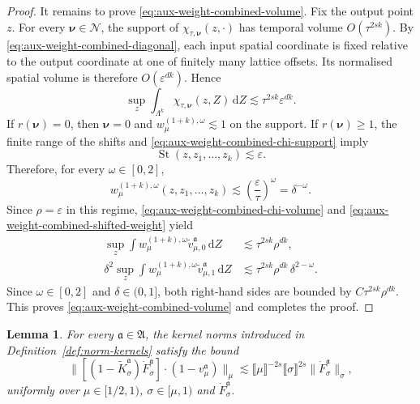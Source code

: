 \documentclass{article}
\numberwithin{equation}{section}
\newcommand{\mathd}{\mathrm{d}}
\theoremstyle{plain}
\newtheorem{lemma}[theorem]{Lemma}
\theoremstyle{definition}
\begin{document}
\begin{proof}
	It remains to prove \eqref{eq:aux-weight-combined-volume}. Fix the output
	point $z$. For every $\boldsymbol\nu\in\mathcal N$, the support of
	$\chi_{\tau,\boldsymbol\nu}(z,\cdot)$ has temporal volume
	$O(\tau^{2sk})$. By \eqref{eq:aux-weight-combined-diagonal}, each input
	spatial coordinate is fixed relative to the output coordinate at one of
	finitely many lattice offsets. Its normalised spatial volume is therefore
	$O(\varepsilon^{dk})$. Hence
	\begin{equation}
		\label{eq:aux-weight-combined-chi-volume}
		\sup_z\int_{\Lambda^k}
		\chi_{\tau,\boldsymbol\nu}(z,Z)\,\mathd Z
		\lesssim
		\tau^{2sk}\varepsilon^{dk}.
	\end{equation}
	If $r(\boldsymbol\nu)=0$, then $\boldsymbol\nu=0$ and
	$w_\mu^{(1+k),\omega}\lesssim1$ on the support. If
	$r(\boldsymbol\nu)\geqslant1$, the finite range of the shifts and
	\eqref{eq:aux-weight-combined-chi-support} imply
	\[
	\operatorname{St}(z,z_1,\ldots,z_k)\lesssim\varepsilon.
	\]
	Therefore, for every $\omega\in[0,2]$,
	\begin{equation}
		\label{eq:aux-weight-combined-shifted-weight}
		w_\mu^{(1+k),\omega}(z,z_1,\ldots,z_k)
		\lesssim
		\left(\frac{\varepsilon}{\tau}\right)^\omega
		=\delta^{-\omega}.
	\end{equation}
	Since $\rho=\varepsilon$ in this regime,
	\eqref{eq:aux-weight-combined-chi-volume} and
	\eqref{eq:aux-weight-combined-shifted-weight} yield
	\begin{align*}
		\sup_z\int
		w_\mu^{(1+k),\omega}
		\tilde v_{\mu,0}^{\mathfrak a}
		\,\mathd Z
		&\lesssim
		\tau^{2sk}\rho^{dk},
		\\
		\delta^2\sup_z\int
		w_\mu^{(1+k),\omega}
		\tilde v_{\mu,1}^{\mathfrak a}
		\,\mathd Z
		&\lesssim
		\tau^{2sk}\rho^{dk}\,
		\delta^{2-\omega}.
	\end{align*}
	Since $\omega\in[0,2]$ and $\delta\in(0,1]$, both right-hand sides
	are bounded by $C\tau^{2sk}\rho^{dk}$. This proves
	\eqref{eq:aux-weight-combined-volume} and completes the proof.
\end{proof}


\begin{lemma}
  \label{lem:estimates-1-K-coeff} For every \(\mathfrak a\in\mathfrak A\), the kernel norms introduced in
  Definition~\ref{def:norm-kernels} satisfy the bound
  \[ \| [(1 - \tilde{K}^{\mathfrak{a}}_{\sigma})
     \dot{F}^{\mathfrak{a}}_{\sigma}] \cdot (1 - v_{\mu}^{\mathfrak{a}})
     \|_{\mu} \lesssim \llbracket \mu \rrbracket^{- 2 s}  \llbracket \sigma
     \rrbracket^{2 s}  \| \dot{F}^{\mathfrak{a}}_{\sigma} \|_{\sigma}, \]
  uniformly over $\mu \in [1 / 2, 1)$, $\sigma \in [\mu, 1)$ and
  $\dot{F}^{\mathfrak{a}}_{\sigma}$.
\end{lemma}
\end{document}
